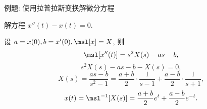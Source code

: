 \begin{frame}{例题: 使用拉普拉斯变换解微分方程}
\begin{example}
解方程 $x''(t)-x(t)=0$.
\end{example}
\begin{solution}
设 $a=x(0),b=x'(0),\msl[x]=X$,
\onslide<+->
则
\[\msl[x''(t)]=s^2X(s)-as-b,\]
\onslide<+->
\vspace{-\baselineskip}
\[s^2X(s)-as-b-X(s)=0,\]
\onslide<+->
\vspace{-0.8\baselineskip}
\[X(s)=\frac{as-b}{s^2-1}=\frac{a+b}2\cdot\frac1{s-1}+\frac{a-b}2\cdot\frac1{s+1},\]
\onslide<+->
\vspace{-0.8\baselineskip}
\[x(t)=\msl^{-1}[X(s)]=\frac{a+b}2e^t+\frac{a-b}2e^{-t}.\]
\end{solution}
\end{frame}

